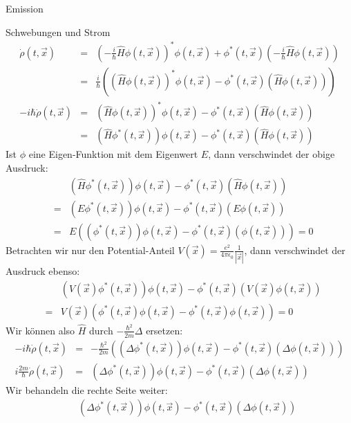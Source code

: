 \begin{chapter}{\titlestr}
\begin{section}{Emission}
\begin{subsection}{Schwebungen und Strom}
\begin{eqnarray*}
\dot{\rho}(t,\vec{x}) &=& \left(-\frac{i}{\hbar}\hat{H}\phi(t,\vec{x})\right)^*\phi(t,\vec{x})+\phi^*(t,\vec{x})\left(-\frac{i}{\hbar}\hat{H}\phi(t,\vec{x})\right)\\
&=& \frac{i}{\hbar}\left(\left(\hat{H}\phi(t,\vec{x})\right)^*\phi(t,\vec{x})-\phi^*(t,\vec{x})\left(\hat{H}\phi(t,\vec{x})\right)\right)\\
-i\hbar\dot{\rho}(t,\vec{x})&=& \left(\hat{H}\phi(t,\vec{x})\right)^*\phi(t,\vec{x})-\phi^*(t,\vec{x})\left(\hat{H}\phi(t,\vec{x})\right)\\
&=& \left(\hat{H}\phi^*(t,\vec{x})\right)\phi(t,\vec{x})-\phi^*(t,\vec{x})\left(\hat{H}\phi(t,\vec{x})\right)
\end{eqnarray*}
Ist $\phi$ eine Eigen-Funktion mit dem Eigenwert $E$, dann verschwindet der obige Ausdruck:
\begin{eqnarray*}
&&\left(\hat{H}\phi^*(t,\vec{x})\right)\phi(t,\vec{x})-\phi^*(t,\vec{x})\left(\hat{H}\phi(t,\vec{x})\right)\\
&=&\left(E\phi^*(t,\vec{x})\right)\phi(t,\vec{x})-\phi^*(t,\vec{x})\left(E\phi(t,\vec{x})\right)\\
&=&E\left(\left(\phi^*(t,\vec{x})\right)\phi(t,\vec{x})-\phi^*(t,\vec{x})\left(\phi(t,\vec{x})\right)\right)=0
\end{eqnarray*}
Betrachten wir nur den Potential-Anteil $V(\vec{x})=\frac{e^2}{4\pi\epsilon_0}\frac{1}{|\vec{x}|}$, dann verschwindet der Ausdruck ebenso:
\begin{eqnarray*}
&&\left(V(\vec{x})\phi^*(t,\vec{x})\right)\phi(t,\vec{x})-\phi^*(t,\vec{x})\left(V(\vec{x})\phi(t,\vec{x})\right)\\
&=&V(\vec{x})\left(\phi^*(t,\vec{x})\phi(t,\vec{x})-\phi^*(t,\vec{x})\phi(t,\vec{x})\right)=0
\end{eqnarray*}
Wir können also $\hat{H}$ durch $-\frac{\hbar^2}{2m}\Delta$ ersetzen:
\begin{eqnarray*}
-i\hbar\dot{\rho}(t,\vec{x}) &=&-\frac{\hbar^2}{2m}\left(\left(\Delta\phi^*(t,\vec{x})\right)\phi(t,\vec{x})-\phi^*(t,\vec{x})\left(\Delta\phi(t,\vec{x})\right)\right)\\
i\frac{2m}{\hbar}\dot{\rho}(t,\vec{x}) &=&\left(\Delta\phi^*(t,\vec{x})\right)\phi(t,\vec{x})-\phi^*(t,\vec{x})\left(\Delta\phi(t,\vec{x})\right)
\end{eqnarray*}
Wir behandeln die rechte Seite weiter:
\begin{eqnarray*}
&&\left(\Delta\phi^*(t,\vec{x})\right)\phi(t,\vec{x})-\phi^*(t,\vec{x})\left(\Delta\phi(t,\vec{x})\right)\\

\end{eqnarray*}
\end{subsection}
\end{section}
\end{chapter}
